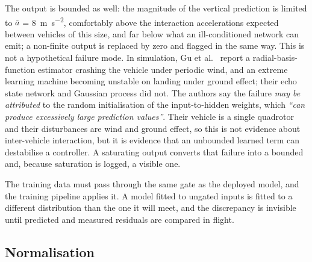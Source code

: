 The output is bounded as well: the magnitude of the vertical prediction is limited to
$\bar a$ = \SI{8}{\metre\per\second\squared}, comfortably above the
interaction accelerations expected between vehicles of this size, and far below what an
ill-conditioned network can emit; a non-finite output is replaced by zero and flagged in the same
way. This is not a hypothetical failure mode. In simulation, Gu et
al.~\cite{gu2025comparative} report a radial-basis-function estimator crashing the vehicle under
periodic wind, and an extreme learning machine becoming unstable on landing under ground effect;
their echo state network and Gaussian process did not. The authors say the failure \emph{may be
attributed} to the random initialisation of the input-to-hidden weights, which \emph{``can produce
excessively large prediction values''}. Their vehicle is a single quadrotor and their disturbances
are wind and ground effect, so this is not evidence about inter-vehicle interaction, but it is
evidence that an unbounded learned term can destabilise a controller. A saturating output converts
that failure into a bounded and, because saturation is logged, a visible one.

The training data must pass through the same gate as the deployed model, and the training pipeline
applies it. A model fitted to ungated inputs is fitted to a different distribution than the one it
will meet, and the discrepancy is invisible until predicted and measured residuals are compared in
flight.

\subsection{Normalisation}

